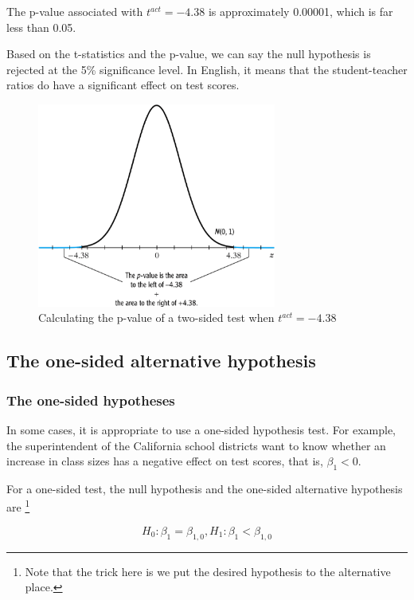 \documentclass[a4paper,11pt]{article}
\begin{document}
The p-value associated with \(t^{act} = -4.38\) is approximately
0.00001, which is far less than 0.05.

Based on the t-statistics and the p-value, we can say the null
hypothesis is rejected at the 5\% significance level. In English, it
means that the student-teacher ratios do have a significant effect on
test scores.

\begin{figure}[htbp]
\centering
\includegraphics[width=0.7\textwidth]{figure/fig-5-1.png}
\caption{\label{fig:org7f41bb7}
Calculating the p-value of a two-sided test when \(t^{act}=-4.38\)}
\end{figure}


\subsection{The one-sided alternative hypothesis}
\label{sec:org0e7eb0d}

\subsubsection*{The one-sided hypotheses}
\label{sec:orgef11d26}

In some cases, it is appropriate to use a one-sided hypothesis
test. For example, the superintendent of the California school
districts want to know whether an increase in class sizes has a
negative effect on test scores, that is, \(\beta_1 < 0\).

For a one-sided test, the null hypothesis and the one-sided
alternative hypothesis are \footnote{Note that the trick here is we put the
desired hypothesis to the alternative place.}

\[ H_0: \beta_1 = \beta_{1,0}, H_1: \beta_1 < \beta_{1,0} \]
\end{document}
